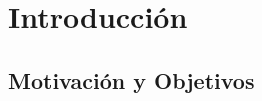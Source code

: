 \chapter{Introducci\'on}
\label{cap:introduccion}













\section{Motivaci\'on y Objetivos}
\label{sec:intro.objetivos}

